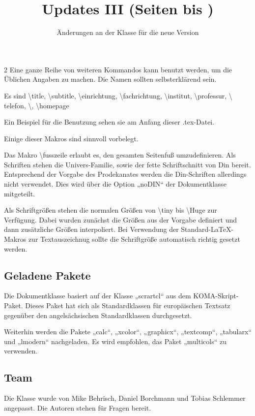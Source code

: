 \documentclass[serifmath,a0paper,noDIN,MathematikA0]{tudmathposter}
\begin{document}
\begin{multicols}2
  Eine ganze Reihe von weiteren Kommandos kann benutzt werden, um
  die Üblichen Angaben zu machen. Die Namen sollten selbsterklärend
  sein.

  Es sind \textbackslash title, \textbackslash subtitle,
  \textbackslash einrichtung, \textbackslash fachrichtung,
  \textbackslash institut, \textbackslash professur, \textbackslash
  telefon, \textbackslash \fax, \textbackslash homepage
  
  Ein Beispiel für die Benutzung sehen sie am Anfang dieser .tex-Datei.
  
  Einige dieser Makros sind sinnvoll vorbelegt.
  
  Das Makro
  \textbackslash fusszeile erlaubt es, den gesamten Seitenfuß
  umzudefinieren.
  Als Schriften stehen die Univers-Familie, sowie der fette
  Schriftschnitt von Din bereit. Entsprechend der Vorgabe des
  Prodekanates werden die Din-Schriften allerdings nicht
  verwendet. Dies wird über die Option „noDIN“ der Dokumentklasse
  mitgeteilt.

  Als Schriftgrößen stehen die normalen Größen von \textbackslash tiny
  bis \textbackslash Huge zur Verfügung. Dabei wurden zunächst die
  Größen aus der Vorgabe definiert und dann zusätzliche Größen
  interpoliert. Bei Verwendung der Standard-\LaTeX-Makros zur
  Textauszeichnug sollte die Schriftgröße automatisch richtig gesetzt
  werden.
  \enlargethispage{4\baselineskip}
\subsection{Geladene Pakete}
  Die Dokumentklasse basiert auf der Klasse „scrartcl“ aus dem
  KOMA-Skript-Paket. Dieses Paket hat sich als Standardklassen für
  europäischen Textsatz gegenüber den angelsächsischen Standardklassen
  durchgesetzt.

  Weiterhin werden die Pakete „calc“, „xcolor“, „graphicx“,
  „textcomp“, „tabularx“ und „lmodern“ nachgeladen. Es wird empfohlen,
  das Paket „multicols“ zu verwenden.

  \subsection{Team}
  Die Klasse wurde von Mike Behrisch, Daniel Borchmann und Tobias
  Schlemmer angepasst. Die Autoren stehen für Fragen bereit.
\end{multicols}
\pagebreak
\fax{}\label{Updanfang}%
\title{Updates III (Seiten \pageref{Updanfang} bis \pageref{Updende})}%
\subtitle{Änderungen an der Klasse für die neue Version}
\maketitle
\end{document}
